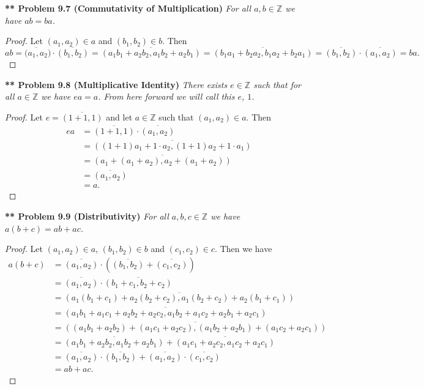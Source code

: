 \documentclass{article}
\begin{document}
\begin{flushleft}
\textbf{** Problem 9.7 (Commutativity of Multiplication)}
\textit{For all $a, b \in \mathbb{Z}$ we have $ab = ba$.}
\begin{proof}
Let $(a_1, a_2) \in a$ and $(b_1, b_2) \in b$. Then
\[
ab = \overline{(a_1, a_2}) \cdot \overline{(b_1, b_2)} = \overline{(a_1b_1 + a_2b_2, a_1b_2 + a_2b_1)} = \overline{(b_1a_1 + b_2a_2, b_1a_2 + b_2a_1)} = \overline{(b_1, b_2)} \cdot \overline{(a_1, a_2)} = ba.
\]
\end{proof}

\textbf{** Problem 9.8 (Multiplicative Identity)}
\textit{There exists $e \in \mathbb{Z}$ such that for all $a \in \mathbb{Z}$ we have $ea = a$. From here forward we will call this $e$, $1$.}
\begin{proof}
Let $e = \overline{(1+1, 1)}$ and let $a \in \mathbb{Z}$ such that $(a_1, a_2) \in a$. Then
\begin{align*}
ea
&= \overline{(1+1, 1)} \cdot \overline{(a_1, a_2)}\\
&= \overline{((1+1)a_1 + 1 \cdot a_2, (1+1)a_2 + 1 \cdot a_1)}\\
&= \overline{(a_1 + (a_1 + a_2), a_2 + (a_1 + a_2))}\\
&= \overline{(a_1, a_2)}\\
&= a.
\end{align*}
\end{proof}

\textbf{** Problem 9.9 (Distributivity)}
\textit{For all $a,b,c \in \mathbb{Z}$ we have $a(b+c) = ab + ac$.}
\begin{proof}
Let $(a_1,a_2) \in a$, $(b_1,b_2) \in b$ and $(c_1,c_2) \in c$. Then we have
\begin{align*}
a(b+c)
&= \overline{(a_1, a_2)} \cdot \left ( \overline{(b_1, b_2)} + \overline{(c_1, c_2)} \right )\\
&= \overline{(a_1, a_2)} \cdot \overline{(b_1 + c_1, b_2 + c_2)}\\
&= \overline{(a_1(b_1 + c_1) + a_2(b_2 + c_2), a_1(b_2 + c_2) + a_2(b_1 + c_1))}\\
&= \overline{(a_1b_1 + a_1c_1 + a_2b_2 + a_2c_2, a_1b_2 + a_1c_2 + a_2b_1 + a_2c_1)}\\
&= \overline{((a_1b_1 + a_2b_2) + (a_1c_1 + a_2c_2), (a_1b_2 + a_2b_1) + (a_1c_2 + a_2c_1))}\\
&= \overline{(a_1b_1 + a_2b_2, a_1b_2 + a_2b_1)} + \overline{(a_1c_1 + a_2c_2, a_1c_2 + a_2c_1)}\\
&= \overline{(a_1, a_2)} \cdot \overline{(b_1, b_2)} + \overline{(a_1, a_2)} \cdot \overline{(c_1, c_2)}\\
&= ab + ac.
\end{align*}
\end{proof}


\end{flushleft}
\end{document}
